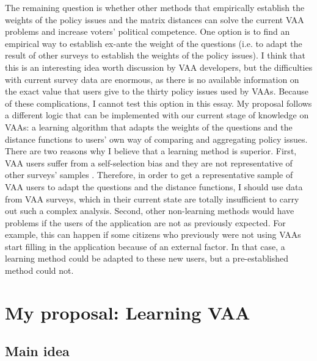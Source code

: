 \documentclass{scrartcl}
\begin{document}
The remaining question is whether other methods that empirically establish the weights of the policy issues and the matrix distances can solve the current VAA problems and increase voters' political competence. One option is to find an empirical way to establish ex-ante the weight of the questions (i.e. to adapt the result of other surveys to establish the weights of the policy issues). I think that this is an interesting idea worth discussion by VAA developers, but the difficulties with current survey data are enormous, as there is no available information on the exact value that users give to the thirty policy issues used by VAAs. Because of these complications, I cannot test this option in this essay. My proposal follows a different logic that can be implemented with our current stage of knowledge on VAAs: a learning algorithm that adapts the weights of the questions and the distance functions to users' own way of comparing and aggregating policy issues. There are two reasons why I believe that a learning method is superior. First, VAA users suffer from a self-selection bias and they are not representative of other surveys' samples \cite{cedroni2010voting}. Therefore, in order to get a representative sample of VAA users to adapt the questions and the distance functions, I should use data from VAA surveys, which in their current state are totally insufficient to carry out such a complex analysis. Second, other non-learning methods would have problems if the users of the application are not as previously expected. For example, this can happen if some citizens who previously were not using VAAs start filling in the application because of an external factor. In that case, a learning method could be adapted to these new users, but a pre-established method could not.

\section{My proposal: Learning VAA}
\subsection{Main idea}
\end{document}
